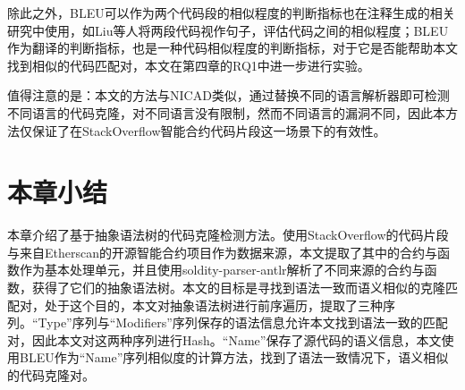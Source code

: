 除此之外，BLEU可以作为两个代码段的相似程度的判断指标也在注释生成的相关研究中使用，如Liu等人\cite{bleu-example}将两段代码视作句子，评估代码之间的相似程度；BLEU作为翻译的判断指标，也是一种代码相似程度的判断指标，对于它是否能帮助本文找到相似的代码匹配对，本文在第四章的RQ1中进一步进行实验。

值得注意的是：本文的方法与NICAD类似，通过替换不同的语言解析器即可检测不同语言的代码克隆，对不同语言没有限制，然而不同语言的漏洞不同，因此本方法仅保证了在StackOverflow智能合约代码片段这一场景下的有效性。

\section{本章小结}

本章介绍了基于抽象语法树的代码克隆检测方法。使用StackOverflow的代码片段与来自Etherscan的开源智能合约项目作为数据来源，本文提取了其中的合约与函数作为基本处理单元，并且使用soldity-parser-antlr解析了不同来源的合约与函数，获得了它们的抽象语法树。本文的目标是寻找到语法一致而语义相似的克隆匹配对，处于这个目的，本文对抽象语法树进行前序遍历，提取了三种序列。“Type”序列与“Modifiers”序列保存的语法信息允许本文找到语法一致的匹配对，因此本文对这两种序列进行Hash。“Name”保存了源代码的语义信息，本文使用BLEU作为“Name”序列相似度的计算方法，找到了语法一致情况下，语义相似的代码克隆对。